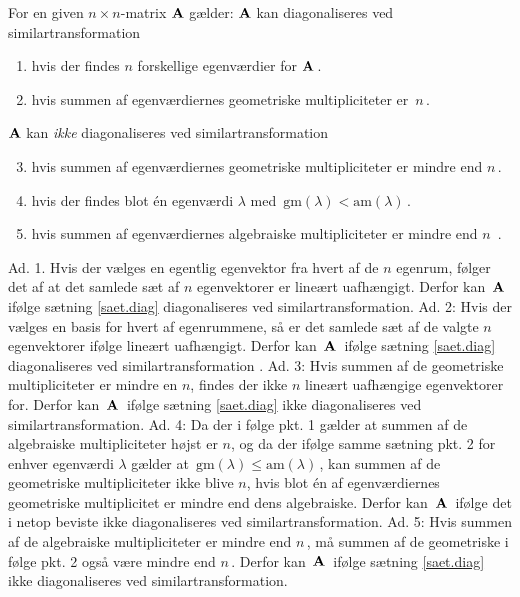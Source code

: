 \begin{theorem}\label{diagonaliserbarhed}
For en given $n\times n$-matrix $ \mathbf{A} $ gælder:\bs
 $ \mathbf{A} $ kan diagonaliseres ved similartransformation 
\begin{enumerate}
\item
hvis der findes $n$ forskellige egenværdier for  $ \mathbf{A}\,$.
\item
 hvis summen af egenværdiernes geometriske multipliciteter er $\,n\,$.
\end{enumerate}
 $ \mathbf{A} $ kan \textit{ikke} diagonaliseres ved similartransformation 
\begin{enumerate}
\setcounter{enumi}{2}
\item
hvis summen af egenværdiernes geometriske multipliciteter er mindre end $n\,$.
\item
hvis der findes blot én egenværdi $\lambda$ med $\,\mathrm{gm}(\lambda)<\mathrm{am}(\lambda)\,$.
\item
hvis summen af egenværdiernes algebraiske multipliciteter er mindre end $n\,$
.\end{enumerate}
\end{theorem}
\begin{bevis}
Ad. 1. Hvis der vælges en egentlig egenvektor fra hvert af de $n$ egenrum, følger det af   at det samlede sæt af $n$ egenvektorer er lineært uafhængigt. Derfor kan $\,\mathbf{A}\,$ ifølge sætning \ref{saet.diag} diagonaliseres ved similartransformation.\bs
Ad. 2:
Hvis der vælges en basis for hvert af egenrummene, så er det samlede sæt af de valgte $n$ egenvektorer ifølge  lineært uafhængigt. Derfor kan $\,\mathbf{A}\,$ ifølge sætning \ref{saet.diag} diagonaliseres ved similartransformation .\bs
Ad. 3:
Hvis summen af de geometriske multipliciteter er mindre en $n$, findes der ikke $n$ lineært uafhængige egenvektorer for. Derfor kan $\,\mathbf{A}\,$ ifølge sætning \ref{saet.diag} ikke diagonaliseres ved similartransformation. \bs 
Ad. 4:
Da der i følge  pkt. 1 gælder at summen af de algebraiske multipliciteter højst er $n$, og da der ifølge samme sætning pkt. 2 for enhver egenværdi $\lambda$ gælder at $\,\mathrm{gm}(\lambda)\leq \mathrm{am}(\lambda)\,$, kan summen af de geometriske multipliciteter ikke blive $n$, hvis blot én af egenværdiernes geometriske multiplicitet er mindre end dens algebraiske. Derfor kan $\,\mathbf{A}\,$ ifølge  det i netop beviste ikke diagonaliseres ved similartransformation. \bs
Ad. 5:
Hvis summen af de algebraiske multipliciteter er mindre end $n\,$, må summen af de geometriske i følge  pkt. 2 også være mindre end $n\,$. Derfor kan $\,\mathbf{A}\,$ ifølge sætning \ref{saet.diag} ikke diagonaliseres ved similartransformation. 
\end{bevis}


